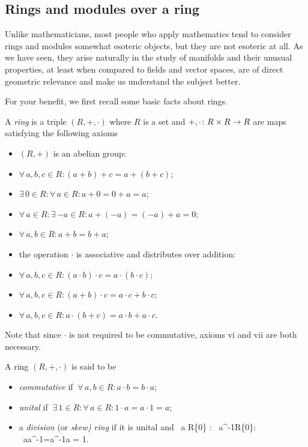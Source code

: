 \subsection{Rings and modules over a ring}

Unlike mathematicians, most people who apply mathematics tend to consider rings and modules somewhat esoteric objects, but they are not esoteric at all. As we have seen, they arise naturally in the study of manifolds and their unusual properties, at least when compared to fields and vector spaces, are of direct geometric relevance and make us understand the subject better.

For your benefit, we first recall some basic facts about rings.

\bd
A \emph{ring} is a triple $(R,+,\cdot)$ where $R$ is a set and $+,\cdot\colon R\times R\to R$ are maps satisfying the following axioms
\begin{itemize}
\item $(R,+)$ is an abelian group:
\ben[label=\roman*)]
\item $\forall \, a,b,c \in R : (a+b)+c=a+(b+c)$;
\item $\exists \, 0 \in R : \forall \, a \in R : a+0=0+a=a$;
\item $\forall \, a \in R : \exists \, {-a} \in R : a+(-a)=(-a)+a=0$;
\item $\forall \, a,b \in R : a+b=b+a$;
\een
\item the operation $\cdot$ is associative and distributes over addition:
\ben[label=\roman*),start=5]
\item $\forall \, a,b,c \in R : (a\cdot b)\cdot c=a\cdot (b\cdot c)$;
\item $\forall \, a,b,c \in R : (a+ b)\cdot c=a\cdot c + b\cdot c$;
\item $\forall \, a,b,c \in R : a \cdot (b+c)=a\cdot b + a\cdot c$.
\een
\end{itemize}
Note that since $\cdot$ is not required to be commutative, axioms vi and vii are both necessary.
\ed

\bd 
A ring $(R,+,\cdot)$ is said to be
\begin{itemize}
\item \emph{commutative} if $\ \forall \, a,b\in R : a\cdot b = b \cdot a$;
\item \emph{unital} if $\ \exists\, 1\in R : \forall \, a\in R : 1\cdot a = a \cdot 1 = a$;
\item a \emph{division} (or \emph{skew) ring} if it is unital and 
\bse
\forall\, a \in R\sm\{0\} : \exists \, a^{-1}\in R\sm\{0\}: \ a\cdot a^{-1}=a^{-1}\cdot a = 1.
\ese
\end{itemize}
\ed

